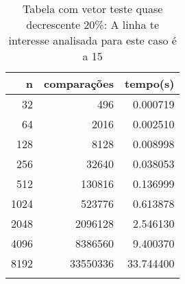 \begin{table}[ht]
\centering
\begin{tabular}{rrr} \toprule
        n &    comparações &       tempo(s) \\ \midrule
      32  &            496 &      0.000719 \\
      64  &           2016 &      0.002510 \\
     128  &           8128 &      0.008998 \\
     256  &          32640 &      0.038053 \\
     512  &         130816 &      0.136999 \\
    1024  &         523776 &      0.613878 \\
    2048  &        2096128 &      2.546130 \\
    4096  &        8386560 &      9.400370 \\
    8192  &       33550336 &     33.744400 \\
\bottomrule\addlinespace
\end{tabular}
\caption{Tabela com vetor teste quase decrescente 20\%: A linha te interesse analisada para este caso é a 15}
\label{tab:selectionsortQuaseDecresc20}
\end{table}
